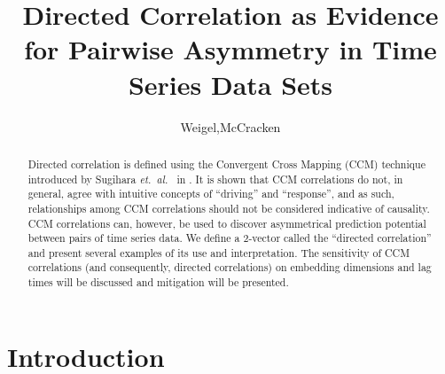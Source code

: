 \documentclass[]{article}
\title{Directed Correlation as Evidence for Pairwise Asymmetry in Time Series Data Sets}
\author{Weigel,McCracken}
\begin{document}
\maketitle

\begin{abstract}
Directed correlation is defined using the Convergent Cross Mapping (CCM) technique introduced by Sugihara {\em et.\ al.\ } in \cite{}.  It is shown that CCM correlations do not, in general, agree with intuitive concepts of ``driving'' and ``response'', and as such, relationships among CCM correlations should not be considered indicative of causality.  CCM correlations can, however, be used to discover asymmetrical prediction potential between pairs of time series data.  We define a 2-vector called the ``directed correlation'' and present several examples of its use and interpretation.  The sensitivity of CCM correlations (and consequently, directed correlations) on embedding dimensions and lag times will be discussed and mitigation will be presented.
\end{abstract}

\section{Introduction}

\end{document}
